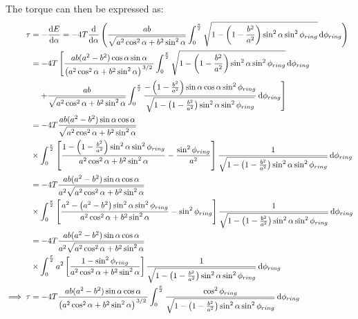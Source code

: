 The torque can then be expressed as:
\begin{align*}
    \tau &= -\dv{E}{\alpha} = -4T\dv{\alpha}\left(\frac{ab}{\sqrt{a^2\cos^2\alpha + b^2\sin^2\alpha}}\int_0^{\frac{\pi}{2}} \sqrt{1 - \left(1 - \frac{b^2}{a^2}\right)\sin^2\alpha\sin^2\phi_{ring}} \dd{\phi_{ring}}\right)\\
    &= -4T\left[\frac{ab(a^2 - b^2)\cos\alpha\sin\alpha}{\left(a^2\cos^2\alpha + b^2\sin^2\alpha\right)^{\flatfrac{3}{2}}}\int_0^{\frac{\pi}{2}} \sqrt{1 - \left(1 - \frac{b^2}{a^2}\right)\sin^2\alpha\sin^2\phi_{ring}} \dd{\phi_{ring}}\right.\\
    &\left.\quad + \frac{ab}{\sqrt{a^2\cos^2\alpha + b^2\sin^2\alpha}}\int_0^{\frac{\pi}{2}} \frac{-\left(1 - \frac{b^2}{a^2}\right)\sin\alpha\cos\alpha\sin^2\phi_{ring}}{\sqrt{1 - \left(1 - \frac{b^2}{a^2}\right)\sin^2\alpha\sin^2\phi_{ring}}} \dd{\phi_{ring}}\right]\\
    &= -4T\frac{ab(a^2 - b^2)\sin\alpha\cos\alpha}{\sqrt{a^2\cos^2\alpha + b^2\sin^2\alpha}}\\
    &\times\int_0^{\frac{\pi}{2}}\left[\frac{1 - \left(1 - \frac{b^2}{a^2}\right)\sin^2\alpha\sin^2\phi_{ring}}{a^2\cos^2\alpha + b^2\sin^2\alpha}-\frac{\sin^2\phi_{ring}}{a^2}\right]\frac{1}{\sqrt{1 - \left(1 - \frac{b^2}{a^2}\right)\sin^2\alpha\sin^2\phi_{ring}}}\dd{\phi_{ring}}\\
    &= -4T\frac{ab(a^2 - b^2)\sin\alpha\cos\alpha}{a^2\sqrt{a^2\cos^2\alpha + b^2\sin^2\alpha}}\\
    &\times\int_0^{\frac{\pi}{2}}\left[\frac{a^2 - \left(a^2 - b^2\right)\sin^2\alpha\sin^2\phi_{ring}}{a^2\cos^2\alpha + b^2\sin^2\alpha}-\sin^2\phi_{ring}\right]\frac{1}{\sqrt{1 - \left(1 - \frac{b^2}{a^2}\right)\sin^2\alpha\sin^2\phi_{ring}}}\dd{\phi_{ring}}\\
    &= -4T\frac{ab(a^2 - b^2)\sin\alpha\cos\alpha}{a^2\sqrt{a^2\cos^2\alpha + b^2\sin^2\alpha}}\\
    &\times\int_0^{\frac{\pi}{2}}a^2\left[\frac{1 - \sin^2\phi_{ring}}{a^2\cos^2\alpha + b^2\sin^2\alpha}\right]\frac{1}{\sqrt{1 - \left(1 - \frac{b^2}{a^2}\right)\sin^2\alpha\sin^2\phi_{ring}}}\dd{\phi_{ring}}\\
    \implies \tau &= -4T\frac{ab(a^2 - b^2)\sin\alpha\cos\alpha}{\left(a^2\cos^2\alpha + b^2\sin^2\alpha\right)^{\flatfrac{3}{2}}}\int_0^{\frac{\pi}{2}}\frac{\cos^2\phi_{ring}}{\sqrt{1 - \left(1 - \frac{b^2}{a^2}\right)\sin^2\alpha\sin^2\phi_{ring}}}\dd{\phi_{ring}}
\end{align*}

